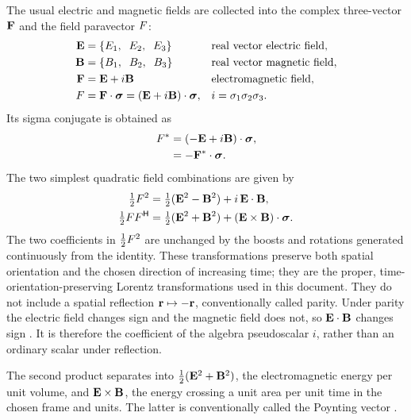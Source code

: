 The usual electric and magnetic fields \cite{maxwell1865,jackson1998} are
collected into the complex three-vector \(\mathbf{F}\) and the field
paravector \(F\):
\begin{align*}
\vct{E} &= \vthree{E_{1}}{E_{2}}{E_{3}}
&& \text{real vector electric field},\notag \\
\vct{B} &= \vthree{B_{1}}{B_{2}}{B_{3}}
&& \text{real vector magnetic field},\notag \\
\vct{F} &= \vct{E} + i \vct{B} && \text{electromagnetic field},\notag \\
\pv{F} &= \vct{F} \cdot \sigv = (\vct{E} + i \vct{B}) \cdot \sigv, && i = \pv{\sigma}_{1}\pv{\sigma}_{2}\pv{\sigma}_{3}.
\end{align*}
Its sigma conjugate is obtained as
\begin{align*}
F^{*} &= (-\mathbf{E} + i \mathbf{B}) \cdot \mathbf{\bm{\sigma}},\notag \\
&= -\mathbf{F}^{*} \cdot \mathbf{\bm{\sigma}}.
\end{align*}
The two simplest quadratic field combinations are given by
\begin{align*}
\tfrac12F^2
&=\tfrac12(\mathbf{E}^2-\mathbf{B}^2)+i\,\mathbf{E}\cdot\mathbf{B},\\
\tfrac12FF^{\mathsf H}
&=\tfrac12(\mathbf{E}^2+\mathbf{B}^2)+(\mathbf{E}\times\mathbf{B})\cdot\mathbf{\bm{\sigma}}.
\end{align*}
The two coefficients in \(\tfrac12F^2\) are unchanged by the boosts
and rotations generated continuously from the identity. These
transformations preserve both spatial orientation and the chosen direction
of increasing time; they are the proper, time-orientation-preserving Lorentz
transformations used in
this document. They do not include a spatial reflection
\(\mathbf{r}\mapsto-\mathbf{r}\), conventionally called parity. Under parity the
electric field changes sign and the magnetic field does not, so
\(\mathbf{E}\cdot\mathbf{B}\) changes sign
\cite{jackson1998}. It is therefore the coefficient of the algebra
pseudoscalar \(i\), rather than an ordinary scalar under reflection.

The second product separates into
\(\tfrac12(\mathbf{E}^{2}+\mathbf{B}^{2})\), the electromagnetic energy per unit
volume, and \(\mathbf{E}\times\mathbf{B}\), the energy crossing a unit area per
unit time in the chosen frame and units. The latter is conventionally
called the Poynting vector \cite{maxwell1865,jackson1998}.

